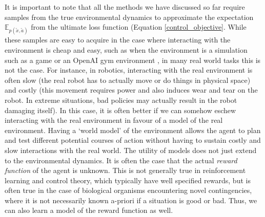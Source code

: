 It is important to note that all the methods we have discussed so far require samples from the true environmental dynamics to approximate the expectation $\mathbb{E}_{p(\tilde{x}, \tilde{a})}$ from the ultimate loss function (Equation \ref{control_objective}. While these samples are easy to acquire in the case where interacting with the environment is cheap and easy, such as when the environment is a simulation such as a game or an OpenAI gym environment \citep{brockman2016openai}, in many real world tasks this is not the case. For instance, in robotics, interacting with the real environment is often slow (the real robot has to actually move or do things in physical space) and costly (this movement requires power and also induces wear and tear on the robot. In extreme situations, bad policies may actually result in the robot damaging itself). In this case, it is often better if we can somehow eschew interacting with the real environment in favour of a model of the real environment. Having a `world model' \citep{ha_recurrent_2018} of the environment allows the agent to plan and test different potential courses of action without having to sustain costly and slow interactions with the real world. The utility of models does not just extend to the environmental dynamics. It is often the case that the actual \emph{reward function} of the agent is unknown. This is not generally true in reinforcement learning and control theory, which typically have well specified rewards, but is often true in the case of biological organisms encountering novel contingencies, where it is not necessarily known a-priori if a situation is good or bad. Thus, we can also learn a model of the reward function as well.

